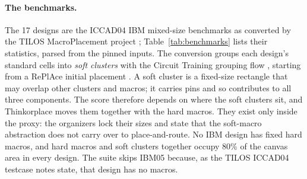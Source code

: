 \paragraph{The benchmarks.} The 17 designs are the ICCAD04 IBM mixed-size
benchmarks \citep{adya2004unification} as converted by the TILOS MacroPlacement
project \citep{macroplacement}; Table~\ref{tab:benchmarks} lists their statistics,
parsed from the pinned inputs. The conversion groups each design's standard cells
into \emph{soft clusters} with the Circuit Training grouping flow
\citep{mirhoseini2021graph}, starting from a RePlAce initial placement
\citep{cheng2019replace}. A soft cluster is a fixed-size rectangle that may
overlap other clusters and macros; it carries pins and so contributes to all three
components. The score therefore depends on where the soft clusters sit, and
Thinkorplace moves them together with the hard macros. They exist only inside the
proxy: the organizers lock their sizes and state that the soft-macro abstraction
does not carry over to place-and-route. No IBM design has fixed hard macros, and
hard macros and soft clusters together occupy 80\% of the canvas area in every
design. The suite skips IBM05 because, as the TILOS ICCAD04 testcase notes state,
that design has no macros.
